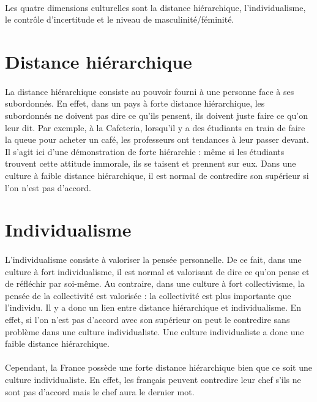 \paragraph{} Les quatre dimensions culturelles sont la distance hiérarchique,
l'individualisme, le contrôle d'incertitude et le niveau de
masculinité/féminité.

\section{Distance hiérarchique}

\paragraph{} La distance hiérarchique consiste au pouvoir fourni à une personne
face à ses subordonnés. En effet, dans un pays à forte distance hiérarchique,
les subordonnés ne doivent pas dire ce qu'ils pensent, ils doivent juste faire
ce qu'on leur dit. Par exemple, à la Cafeteria, lorsqu'il y a des étudiants en
train de faire la queue pour acheter un café, les professeurs ont tendances à
leur passer devant. Il s'agit ici d'une démonstration de forte hiérarchie :
même si les étudiants trouvent cette attitude immorale, ils se taisent et
prennent sur eux. Dans une culture à faible distance hiérarchique, il est
normal de contredire son supérieur si l'on n'est pas d'accord.

\section{Individualisme}

\paragraph{} L'individualisme consiste à valoriser la pensée personnelle. De ce
fait, dans une culture à fort individualisme, il est normal et valorisant de
dire ce qu'on pense et de réfléchir par soi-même. Au contraire, dans une
culture à fort collectivisme, la pensée de la collectivité est valorisée : la
collectivité est plus importante que l'individu. Il y a donc un lien entre
distance hiérarchique et individualisme. En effet, si l'on n'est pas d'accord
avec son supérieur on peut le contredire sans problème dans une culture
individualiste. Une culture individualiste a donc une faible distance
hiérarchique.

\paragraph{} Cependant, la France possède une forte distance hiérarchique bien
que ce soit une culture individualiste. En effet, les français peuvent
contredire leur chef s'ils ne sont pas d'accord mais le chef aura le dernier
mot.

